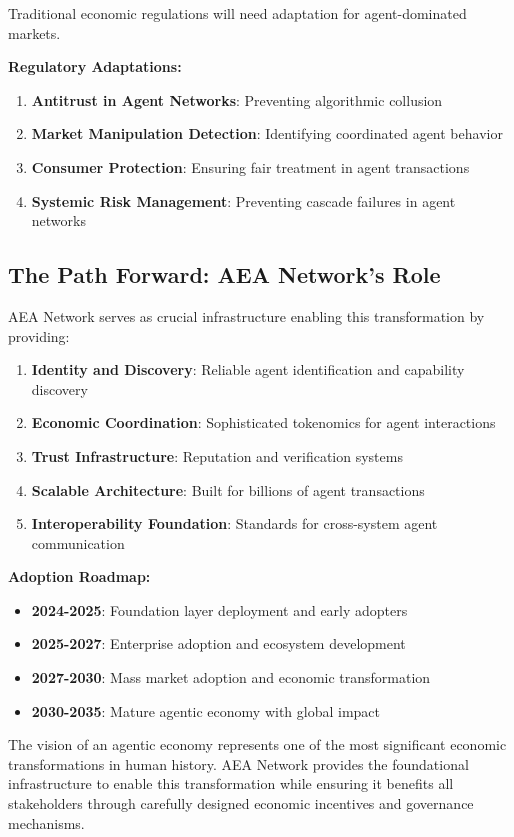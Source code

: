 \documentclass[12pt,a4paper]{article}
\begin{document}
Traditional economic regulations will need adaptation for agent-dominated markets.

\textbf{Regulatory Adaptations:}
\begin{enumerate}
\item \textbf{Antitrust in Agent Networks}: Preventing algorithmic collusion
\item \textbf{Market Manipulation Detection}: Identifying coordinated agent behavior
\item \textbf{Consumer Protection}: Ensuring fair treatment in agent transactions
\item \textbf{Systemic Risk Management}: Preventing cascade failures in agent networks
\end{enumerate}

\subsection{The Path Forward: AEA Network's Role}

AEA Network serves as crucial infrastructure enabling this transformation by providing:

\begin{enumerate}
\item \textbf{Identity and Discovery}: Reliable agent identification and capability discovery
\item \textbf{Economic Coordination}: Sophisticated tokenomics for agent interactions
\item \textbf{Trust Infrastructure}: Reputation and verification systems
\item \textbf{Scalable Architecture}: Built for billions of agent transactions
\item \textbf{Interoperability Foundation}: Standards for cross-system agent communication
\end{enumerate}

\textbf{Adoption Roadmap:}
\begin{itemize}
\item \textbf{2024-2025}: Foundation layer deployment and early adopters
\item \textbf{2025-2027}: Enterprise adoption and ecosystem development
\item \textbf{2027-2030}: Mass market adoption and economic transformation
\item \textbf{2030-2035}: Mature agentic economy with global impact
\end{itemize}

The vision of an agentic economy represents one of the most significant economic transformations in human history. AEA Network provides the foundational infrastructure to enable this transformation while ensuring it benefits all stakeholders through carefully designed economic incentives and governance mechanisms.
\end{document}
